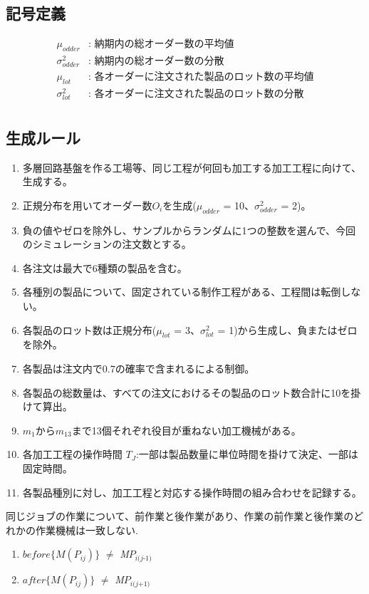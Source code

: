 \documentclass[twocolumn]{jarticle}
\begin{document}
\subsection{記号定義}
\begin{align}
    \mu_{odder} &\text{: 納期内の総オーダー数の平均値} \nonumber\\
    \sigma^2_{odder} &\text{: 納期内の総オーダー数の分散} \nonumber\\
    \mu_{lot} &\text{: 各オーダーに注文された製品のロット数の平均値} \nonumber\\
    \sigma^2_{lot} &\text{: 各オーダーに注文された製品のロット数の分散} \nonumber\\
\end{align}

\subsection{生成ルール}
\begin{enumerate}
    \item 多層回路基盤を作る工場等、同じ工程が何回も加工する加工工程に向けて、生成する。
    \item 正規分布を用いてオーダー数$O_{\textit{i}}$を生成($\mu_{\textit{odder}}$ = 10、$\sigma^2_{\textit{odder}}$ = 2)。
    \item 負の値やゼロを除外し、サンプルからランダムに1つの整数を選んで、今回のシミュレーションの注文数とする。
    \item 各注文は最大で6種類の製品を含む。
    \item 各種別の製品について、固定されている制作工程がある、工程間は転倒しない。
    \item 各製品のロット数は正規分布($\mu_{\textit{lot}}$ = 3、$\sigma^2_{\textit{lot}}$ = 1)から生成し、負またはゼロを除外。
    \item 各製品は注文内で0.7の確率で含まれるによる制御。
    \item 各製品の総数量は、すべての注文におけるその製品のロット数合計に10を掛けて算出。
    \item $m_{\textit{1}}$から$m_{\textit{13}}$まで13個それぞれ役目が重ねない加工機械がある。
    \item 各加工工程の操作時間 $T_{\textit{J}}$:一部は製品数量に単位時間を掛けて決定、一部は固定時間。
    \item 各製品種別に対し、加工工程と対応する操作時間の組み合わせを記録する。
    \end{enumerate}

    同じジョブの作業について、前作業と後作業があり、作業の前作業と後作業のどれかの作業機械は一致しない.\\

\begin{enumerate}
    \item $before\{\textit{M}(P_{\textit{ij}})\}$ $\neq$ \textit{M}$P_{\textit{i(j-1)}}$ \\
    \item $after\{\textit{M}(P_{\textit{ij}})\}$ $\neq$ \textit{M}$P_{\textit{i(j+1)}}$ \\
    \end{enumerate}
\end{document}
